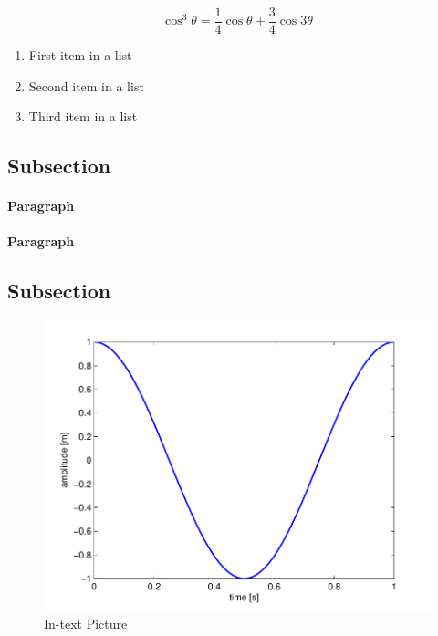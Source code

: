 \documentclass[fleqn,12pt]{SelfArx} %
\begin{document}
\lipsum[4] %

\begin{equation}
\cos^3 \theta =\frac{1}{4}\cos\theta+\frac{3}{4}\cos 3\theta
\label{eq:refname2}
\end{equation}

\lipsum[5] %

\begin{enumerate}[noitemsep] %
\item First item in a list
\item Second item in a list
\item Third item in a list
\end{enumerate}

\subsection{Subsection}

\lipsum[6] %

\paragraph{Paragraph} \lipsum[7] %
\paragraph{Paragraph} \lipsum[8] %

\subsection{Subsection}

\lipsum[9] %

\begin{figure}[ht]\centering
\includegraphics[width=\linewidth]{results}
\caption{In-text Picture}
\label{fig:results}
\end{figure}
\end{document}
